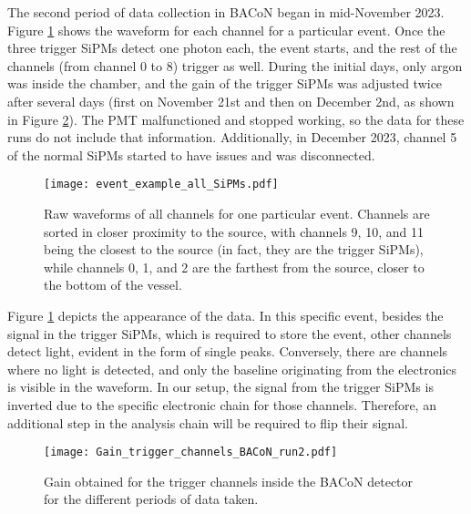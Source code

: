 \documentclass[11pt,a4paper,english,oneside, pdf]{article}
\begin{document}
	The second period of data collection in BACoN began in mid-November 2023. Figure \ref{fig:event_example_all_SiPMs} shows the waveform for each channel for a particular event. Once the three trigger SiPMs detect one photon each, the event starts, and the rest of the channels (from channel 0 to 8) trigger as well. During the initial days, only argon was inside the chamber, and the gain of the trigger SiPMs was adjusted twice after several days (first on November 21st and then on December 2nd, as shown in Figure \ref{fig:Gain_trigger_channels_BACoN_run2}). The PMT malfunctioned and stopped working, so the data for these runs do not include that information. Additionally, in December 2023, channel 5 of the normal SiPMs started to have issues and was disconnected.
	
	\begin{figure}[!h]
		\begin{center}
			\texttt{[image: event\_example\_all\_SiPMs.pdf]}
			\caption{Raw waveforms of all channels for one particular event. Channels are sorted in closer proximity to the source, with channels 9, 10, and 11 being the closest to the source (in fact, they are the trigger SiPMs), while channels 0, 1, and 2 are the farthest from the source, closer to the bottom of the vessel.}
			\label{fig:event_example_all_SiPMs}
		\end{center}
	\end{figure}
	
	Figure \ref{fig:event_example_all_SiPMs} depicts the appearance of the data. In this specific event, besides the signal in the trigger SiPMs, which is required to store the event, other channels detect light, evident in the form of single peaks. Conversely, there are channels where no light is detected, and only the baseline originating from the electronics is visible in the waveform. In our setup, the signal from the trigger SiPMs is inverted due to the specific electronic chain for those channels. Therefore, an additional step in the analysis chain will be required to flip their signal.
	
	
	\begin{figure}[!h]
		\begin{center}
			\texttt{[image: Gain\_trigger\_channels\_BACoN\_run2.pdf]}
			\caption{Gain obtained for the trigger channels inside the BACoN detector for the different periods of data taken.}
			\label{fig:Gain_trigger_channels_BACoN_run2}
		\end{center}
	\end{figure}
	
\end{document}
